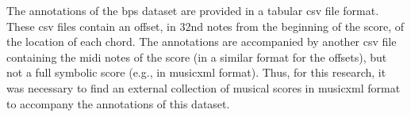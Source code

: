 

The annotations of the \gls{bps} dataset are provided in a
tabular \gls{csv} file format. These \gls{csv} files contain
an offset, in 32nd notes from the beginning of the score, of
the location of each chord. The annotations are accompanied
by another \gls{csv} file containing the \gls{midi} notes of
the score (in a similar format for the offsets), but not a
full symbolic score (e.g., in \gls{musicxml} format). Thus,
for this research, it was necessary to find an external
collection of musical scores in \gls{musicxml} format to
accompany the annotations of this dataset.